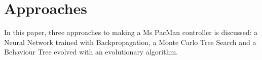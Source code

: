\section{Approaches}
In this paper, three approaches to making a Ms PacMan controller is discussed: a Neural Network trained with Backpropagation, a Monte Carlo Tree Search and a Behaviour Tree evolved with an evolutionary algorithm.







